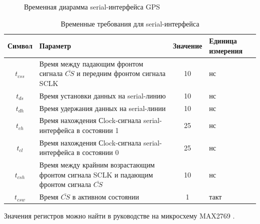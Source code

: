 \begin{figure}[h]
\caption{Временная диарамма serial-интерфейса GPS}
\label{pic:gps_serial}
\end{figure}

\begin{table}[H]
\caption{Временные требования для serial-интерфейса}
\label{tab:gps_serial}
\begin{tabular}{|c|p{250pt}|c|p{70pt}|}
 \hline  
  Символ & Параметр & Значение & Единица измерения  \\  
 \hline  
  $t_{css}$  & Время между падающим фронтом сигнала $\bar {CS}$ и передним фронтом сигнала SCLK	& 10 & нс  \\  
 \hline  
  $t_{ds}$   & Время установки данных на serial-линию	& 10 & нс \\  
 \hline  
  $t_{dh}$   & Время удержания данных на serial-линии	& 10 & нс \\  
 \hline  
  $t_{ch}$   & Время нахождения Сlock-сигнала serial-интерфейса в состоянии 1 & 25 & нс \\  
 \hline  
  $t_{cl}$   & Время нахождения Сlock-сигнала serial-интерфейса в состоянии 0 & 25 & нс \\  
 \hline  
  $t_{csh}$  & Время между крайним возрастающим фронтом сигнала SCLK и падающим фронтом сигнала $\bar {CS}$ & 10 & нс \\  
 \hline  
  $t_{csw}$  & Время $\bar {CS}$ в активном состоянии    & 1 & такт \\  
 \hline  
\end{tabular}
\end{table}

Значения регистров можно найти в руководстве на микросхему MAX2769 \cite{gps_max}.
\newpage

